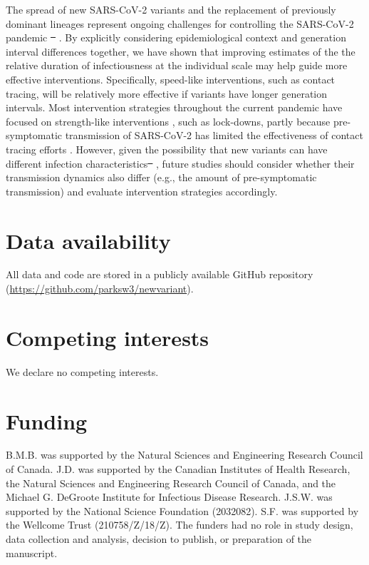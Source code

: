 \documentclass[12pt]{article}
\providecommand{\DIFaddtex}[1]{{\protect\color{blue}\uwave{#1}}} %
\providecommand{\DIFdeltex}[1]{{\protect\color{red}\sout{#1}}}                      %
\providecommand{\DIFaddbegin}{} %
\providecommand{\DIFaddend}{} %
\providecommand{\DIFdelbegin}{} %
\providecommand{\DIFdelend}{} %
\providecommand{\DIFadd}[1]{\texorpdfstring{\DIFaddtex{#1}}{#1}} %
\providecommand{\DIFdel}[1]{\texorpdfstring{\DIFdeltex{#1}}{}} %
\newcommand{\DIFscaledelfig}{0.5}
\newlength{\DIFdelgraphicswidth} %
\newlength{\DIFdelgraphicsheight} %
\newcommand{\DIFaddincludegraphics}[2][]{{\color{blue}\fbox{\DIFOincludegraphics[#1]{#2}}}} %
\newcommand{\DIFdelincludegraphics}[2][]{%
\sbox{\DIFdelgraphicsbox}{\DIFOincludegraphics[#1]{#2}}%
\settoboxwidth{\DIFdelgraphicswidth}{\DIFdelgraphicsbox} %
\settoboxtotalheight{\DIFdelgraphicsheight}{\DIFdelgraphicsbox} %
\scalebox{\DIFscaledelfig}{%
\parbox[b]{\DIFdelgraphicswidth}{\usebox{\DIFdelgraphicsbox}\\[-\baselineskip] \rule{\DIFdelgraphicswidth}{0em}}\llap{\resizebox{\DIFdelgraphicswidth}{\DIFdelgraphicsheight}{%
\setlength{\unitlength}{\DIFdelgraphicswidth}%
\begin{picture}(1,1)%
\thicklines\linethickness{2pt} %
{\color[rgb]{1,0,0}\put(0,0){\framebox(1,1){}}}%
{\color[rgb]{1,0,0}\put(0,0){\line( 1,1){1}}}%
{\color[rgb]{1,0,0}\put(0,1){\line(1,-1){1}}}%
\end{picture}%
}\hspace*{3pt}}} %
} %
\DeclareRobustCommand{\DIFaddbegin}{\DIFOaddbegin \let\includegraphics\DIFaddincludegraphics} %
\DeclareRobustCommand{\DIFaddend}{\DIFOaddend \let\includegraphics\DIFOincludegraphics} %
\DeclareRobustCommand{\DIFdelbegin}{\DIFOdelbegin \let\includegraphics\DIFdelincludegraphics} %
\DeclareRobustCommand{\DIFdelend}{\DIFOaddend \let\includegraphics\DIFOincludegraphics} %
\begin{document}
The spread of new SARS-CoV-2 variants and the replacement of previously dominant lineages represent ongoing challenges for controlling the SARS-CoV-2 pandemic \DIFdelbegin \DIFdel{\mbox{%
\citep{abdool2021new,fontanet2021sars,walensky2021sars}}\hspace{0pt}%
}\DIFdelend \DIFaddbegin \DIFadd{\mbox{%
\citep{abdool2021new,fontanet2021sars,walensky2021sars,pulliam2021increased}}\hspace{0pt}%
}\DIFaddend .  
By explicitly considering epidemiological context and generation interval differences together, we have shown that improving estimates of the the relative duration of infectiousness at the individual scale may help guide more effective interventions. 
Specifically, speed-like interventions, such as contact tracing, will be relatively more effective if variants have longer generation intervals.
Most intervention strategies throughout the current pandemic have focused on strength-like interventions \citep{flaxman2020Rt}, such as lock-downs, partly because pre-symptomatic transmission of SARS-CoV-2 has limited the effectiveness of contact tracing efforts \citep{hellewell2020feasibility}.
However, given the possibility that new variants can have different infection characteristics\DIFdelbegin \DIFdel{\mbox{%
\citep{kissler2021densely}}\hspace{0pt}%
}\DIFdelend , future studies should consider whether their transmission dynamics also differ (e.g., the amount of pre-symptomatic transmission) and evaluate intervention strategies accordingly.

\section*{Data availability}

All data and code are stored in a publicly available GitHub repository (\url{https://github.com/parksw3/newvariant}).

\section*{Competing interests}

We declare no competing interests.

\section*{Funding}

B.M.B. was supported by the Natural Sciences and Engineering Research Council of Canada. 
J.D. was supported by the Canadian Institutes of Health Research, 
the Natural Sciences and Engineering Research Council of Canada, 
and the Michael G. DeGroote Institute for Infectious Disease Research.
J.S.W. was supported by the National Science Foundation (2032082).
S.F. was supported by the Wellcome Trust (210758/Z/18/Z).
The funders had no role in study design, data collection and analysis, decision to publish, or preparation of the manuscript.
\end{document}
